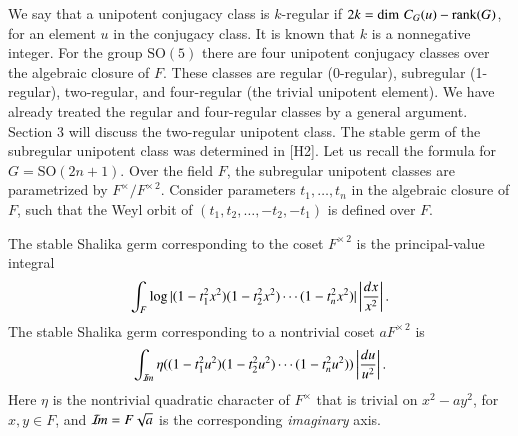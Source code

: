 \documentclass{amsart}
\newcommand\Imm{{\mathcal I\hskip-.2em m}}
\newcommand\rank{\hbox{rank}}
\newenvironment{cthm}[1]
  {\renewcommand\thethm{\sc #1}\thm}
  {\endthm}
\begin{document}
We say that a unipotent conjugacy class is $k$-regular if
$2k = \dim\,C_G(u) - \rank(G)$, for an element $u$ in the conjugacy
class.  It is known that $k$ is a nonnegative integer.   For the
group $\text{SO}(5)$ there are four unipotent conjugacy classes over the
algebraic closure of $F$.  These classes are regular (0-regular),
subregular (1-regular), two-regular, and four-regular (the trivial unipotent
element).  We have already treated the regular and four-regular classes
by a general argument.  
Section 3 will discuss the two-regular unipotent class.
The stable germ of the subregular unipotent class was determined
in [H2].  Let us recall the formula for $G=\text{SO}(2n+1)$.  Over the
field $F$, the subregular unipotent classes are parametrized by
$F^\times/F^{\times\,2}$.  
Consider parameters $t_1,\ldots, t_n$ in the algebraic closure
of $F$, such that the Weyl orbit of $(t_1,t_2,\ldots,-t_2,-t_1)$
is defined over $F$.
\bigskip

\noindent
\begin{cthm}{Theorem 1.2}  The stable Shalika germ corresponding to the
coset $F^{\times\,2}$ is the principal-value integral
$$\int_F \log |(1- t_1^2 x^2)(1-t_2^2 x^2)\cdots (1-t_n^2 x^2)| 
     \left| 
     {dx\over x^2} \right |.$$
The stable Shalika germ corresponding to a nontrivial coset $a F^{\times\,2}$
is
$$\int_{\Imm} \eta((1-t_1^2 u^2)(1-t_2^2 u^2)\cdots (1-t_n^2 u^2))
    \left| {du\over u^2} \right |.$$
Here $\eta$ is the nontrivial quadratic character of $F^\times$
that is trivial on $x^2-a y^2$, for $x,y\in F$,
and $\Imm = F\sqrt{a}$ is the corresponding
{\it imaginary} axis.
\end{cthm}
\end{document}
